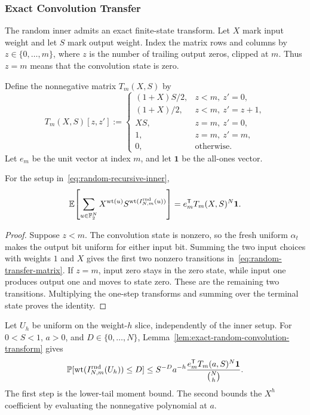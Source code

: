 \subsubsection{Exact Convolution Transfer}

The random inner admits an exact finite-state transform. Let $X$ mark input
weight and let $S$ mark output weight. Index the matrix rows and columns by
$z\in\{0,\ldots,m\}$, where $z$ is the number of trailing output zeros,
clipped at $m$. Thus $z=m$ means that the convolution state is zero.

Define the nonnegative matrix $T_m(X,S)$ by
\begin{equation}
  T_m(X,S)[z,z']
  :=
  \begin{cases}
    (1+X)S/2, & z<m,\ z'=0,\\
    (1+X)/2, & z<m,\ z'=z+1,\\
    XS, & z=m,\ z'=0,\\
    1, & z=m,\ z'=m,\\
    0, & \text{otherwise}.
  \end{cases}
  \label{eq:random-transfer-matrix}
\end{equation}
Let $e_m$ be the unit vector at index $m$, and let $\boldsymbol 1$ be the
all-ones vector.

\begin{lemma}
\label{lem:exact-random-convolution-transform}
For the setup in~\eqref{eq:random-recursive-inner},
\begin{equation}
  \mathbb E\!\left[
    \sum_{u\in\mathbb F_2^N}
    X^{\operatorname{wt}(u)}S^{\operatorname{wt}(I_{N,m}^{\mathrm{rnd}}(u))}
  \right]
  =
  e_m^{\mathsf T}T_m(X,S)^N\boldsymbol 1.
  \label{eq:exact-random-convolution-transform}
\end{equation}
\end{lemma}

\begin{proof}
Suppose $z<m$. The convolution state is nonzero, so the fresh uniform
$\alpha_t$ makes the output bit uniform for either input bit. Summing the two
input choices with weights $1$ and $X$ gives the first two nonzero transitions
in~\eqref{eq:random-transfer-matrix}. If $z=m$, input zero stays in the zero
state, while input one produces output one and moves to state zero. These are
the remaining two transitions. Multiplying the one-step transforms and
summing over the terminal state proves the identity.
\end{proof}

Let $U_h$ be uniform on the weight-$h$ slice, independently of the inner
setup. For $0<S<1$, $a>0$, and $D\in\{0,\ldots,N\}$,
Lemma~\ref{lem:exact-random-convolution-transform} gives
\begin{equation}
  \mathbb P[\operatorname{wt}(I_{N,m}^{\mathrm{rnd}}(U_h))\le D]
  \le
  S^{-D}a^{-h}
  \frac{e_m^{\mathsf T}T_m(a,S)^N\boldsymbol 1}{\binom Nh}.
  \label{eq:random-convolution-tail}
\end{equation}
The first step is the lower-tail moment bound. The second bounds the
$X^h$ coefficient by evaluating the nonnegative polynomial at $a$.

